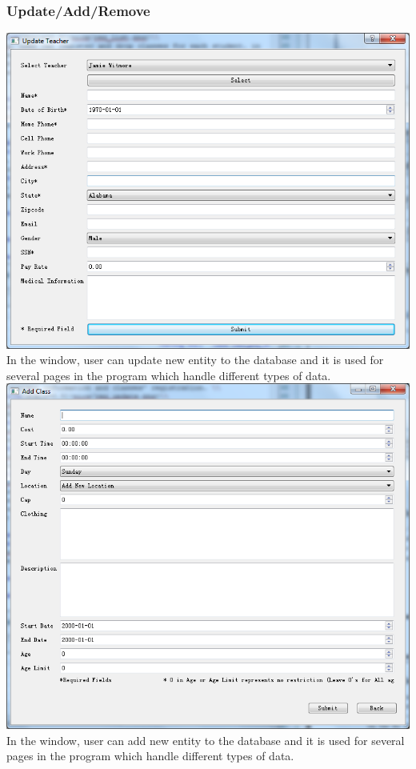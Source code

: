 \subsubsection{Update/Add/Remove}
\includegraphics[scale=0.5]{pics/update.png}\\
In the window, user can update new entity to the database and it is used for several pages in the program which handle different types of data.\\
\includegraphics[scale=0.5]{pics/add.png}\\
In the window, user can add new entity to the database and it is used for several pages in the program which handle different types of data.\\
